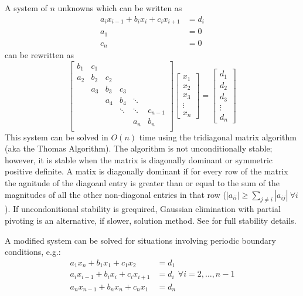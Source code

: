 A system of $n$ unknowns which can be written as
\begin{align}
a_i x_{i-1}+b_i x_i + c_i x_{i+1} &= d_i \\
a_1 &=0                                  \\
c_n &=0
\end{align}
can be rewritten as
\begin{equation}
\begin{bmatrix}
b_1 & c_1 &     &        &        &         \\
a_2 & b_2 & c_2 &        &        &         \\
    & a_3 & b_3 & c_3    &        &         \\
    &     & a_4 & b_4    & \ddots &         \\
    &     &     & \ddots & \ddots & c_{n-1} \\
    &     &     &        & a_n    & b_n     \\
\end{bmatrix}
\begin{bmatrix}
x_1 \\ x_2 \\ x_3 \\ \vdots \\ x_n
\end{bmatrix}
=
\begin{bmatrix}
d_1 \\ d_2 \\ d_3 \\ \vdots \\ d_n
\end{bmatrix}
\end{equation}
This system can be solved in $O(n)$ time using the tridiagonal matrix algorithm (aka the Thomas Algorithm). The algorithm is not unconditionally stable; however, it is stable when the matrix is diagonally dominant or symmetric positive definite. A matix is diagonally dominant if for every row of the matrix the agnitude of the diagoanl entry is greater than or equal to the sum of the magnitudes of all the other non-diagonal entries in that row ($|a_{ii}|\ge\sum_{j\ne i} |a_{ij}|~\forall i$). If uncondonitional stability is grequired, Gaussian elimination with partial pivoting is an alternative, if slower, solution method. See \citep[Theorem 9.12]{Higham2002} for full stability details.

A modified system can be solved for situations involving periodic boundary conditions, e.g.:
\begin{align}
a_1 x_n + b_1 x_1 + c_1 x_2 &= d_1 \\
a_i x_{i-1} + b_i x_i + c_i x_{i+1} &= d_i~~\forall i=2,\ldots,n-1 \\
a_n x_{n-1}+b_n x_n + c_n x_1 &= d_n 
\end{align}

